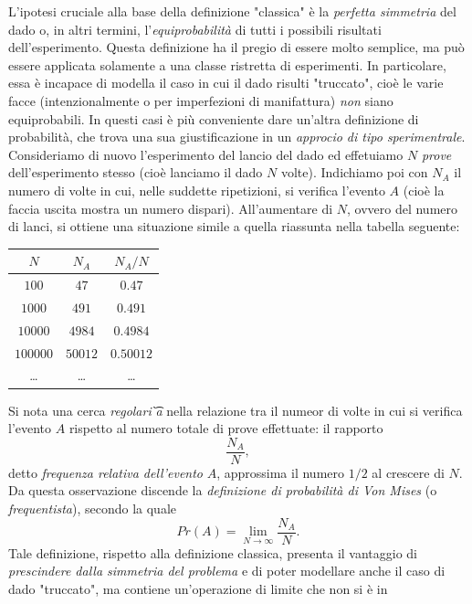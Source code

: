 \documentclass[12pt,oneside,openany]{memoir}
\numberwithin{equation}{subsection}
\begin{document}
L'ipotesi cruciale alla base della definizione "classica" \`e la
\textit{perfetta simmetria} del dado o, in altri termini,
l'\textit{equiprobabilit\`a} di tutti i possibili risultati dell'esperimento.
Questa definizione ha il pregio di essere molto semplice, ma pu\`o essere
applicata solamente a una classe ristretta di esperimenti. In particolare, essa
\`e incapace di modella il caso in cui il dado risulti "truccato", cio\`e le
varie facce (intenzionalmente o per imperfezioni di manifattura) \textit{non}
siano equiprobabili.
\bigbreak
In questi casi \`e pi\`u conveniente dare un'altra definizione di probabilit\`a,
che trova una sua giustificazione in un \textit{approcio di tipo sperimentrale}.
Consideriamo di nuovo l'esperimento del lancio del dado ed effetuiamo $N$
\textit{prove} dell'esperimento stesso (cio\`e lanciamo il dado $N$ volte).
Indichiamo poi con $N_A$ il numero di volte in cui, nelle suddette ripetizioni,
si verifica l'evento $A$ (cio\`e la faccia uscita mostra un numero dispari).
All'aumentare di $N$, ovvero del numero di lanci, si ottiene una situazione
simile a quella riassunta nella tabella seguente:
\begin{center}
    \begin{tabular}{| c | c | c |}
        \hline
        $N$ & $N_A$ & $N_A/N$ \\
        \hline
        $100$ & $47$ & $0.47$ \\
        \hline
        $1000$ & $491$ & $0.491$ \\
        \hline
        $10000$ & $4984$ & $0.4984$ \\
        \hline
        $100000$ & $50012$ & $0.50012$ \\
        \hline
        \dots & \dots & \dots \\
        \hline
    \end{tabular}
\end{center}
Si nota una cerca \textit{regolari\t`a} nella relazione tra il numeor di volte
in cui si verifica l'evento $A$ rispetto al numero totale di prove effettuate:
il rapporto
\[
    \frac{N_A}{N},
\]
detto \textit{frequenza relativa dell'evento} $A$, approssima il numero $1/2$ al
crescere di $N$. Da questa osservazione discende la \textit{definizione di
probabilit\`a di Von Mises} (o \textit{frequentista}), secondo la quale
\[
    Pr(A) = \lim_{N \rightarrow \infty} \frac{N_A}{N}.
\]
Tale definizione, rispetto alla definizione classica, presenta il vantaggio di
\textit{prescindere dalla simmetria del problema} e di poter modellare anche il
caso di dado "truccato", ma contiene un'operazione di limite che non si \`e in
\end{document}

